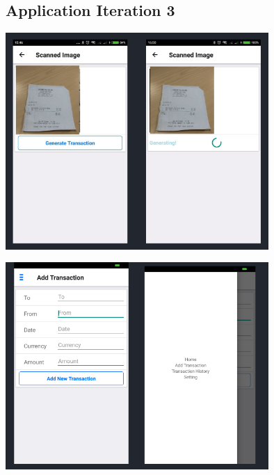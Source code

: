 \documentclass[a4wide, 11pt]{article}
\begin{document}
\subsection{Application Iteration 3}
\label{appIt3}
\includegraphics[width=0.75\textwidth]{appIt3.png}

\includegraphics[width=0.75\textwidth]{appIt4.png}
\end{document}
